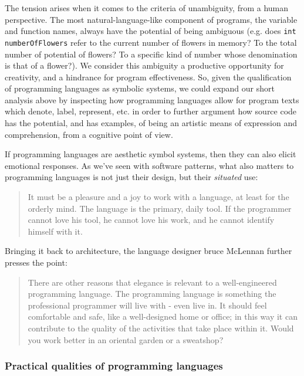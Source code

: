 The tension arises when it comes to the criteria of unambiguity, from a human perspective. The most natural-language-like component of programs, the variable and function names, always have the potential of being ambiguous (e.g. does \lstinline{int numberOfFlowers} refer to the current number of flowers in memory? To the total number of potential of flowers? To a specific kind of number whose denomination is that of a flower?). We consider this ambiguity a productive opportunity for creativity, and a hindrance for program effectiveness. So, given the qualification of programming languages as symbolic systems, we could expand our short analysis above by inspecting how programming languages allow for program texts which denote, label, represent, etc. in order to further argument how source code has the potential, and has examples, of being an artistic means of expression and comprehension, from a cognitive point of view.

If programming languages are aesthetic symbol systems, then they can also elicit emotional responses. As we've seen with software patterns, what also matters to programming languages is not just their design, but their \emph{situated} use:

\begin{quote}
  It must be a pleasure and a joy to work with a language, at least for the orderly mind. The language is the primary, daily tool. If the programmer cannot love his tool, he cannot love his work, and he cannot identify himself with it. \citep{wirth_essence_2003}
\end{quote}

Bringing it back to architecture, the language designer bruce McLennan further presses the point:

\begin{quote}
  There are other reasons that elegance is relevant to a well-engineered programming language. The programming language is something the professional programmer will live with - even live in. It should feel comfortable and safe, like a well-designed home or office; in this way it can contribute to the quality of the activities that take place within it. Would you work better in an oriental garden or a sweatshop? \citep{mclennan_who_1997}
\end{quote}

\subsubsection{Practical qualities of programming languages}
\label{subsubsec:practical-qualities-programming-languages}

